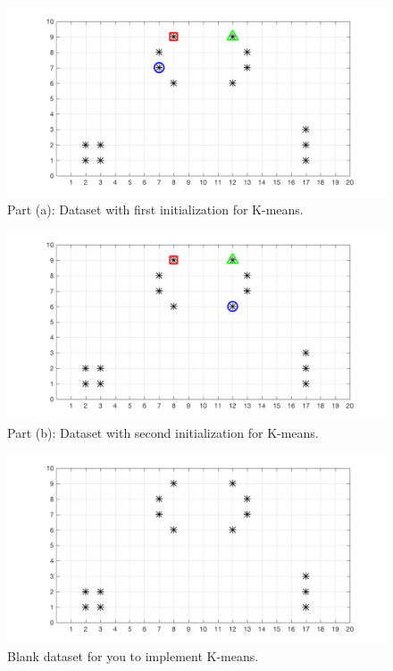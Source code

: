 \begin{enumerate}
\begin{figure}[H]
	\centering
	\includegraphics[scale=0.6]{images/k-means_0}
	\caption{Part (a): Dataset with first initialization for K-means.}
	\label{fig:kmeans_a}
\end{figure}

\begin{figure}[H]
	\centering
	\includegraphics[scale=0.6]{images/k-means_20}
	\caption{Part (b): Dataset with second initialization for K-means.}
	\label{fig:kmeans_b}
\end{figure}

\begin{figure}[H]
  \centering
  \includegraphics[scale=0.6]{images/k-means_blank}
  \caption{Blank dataset for you to implement K-means.}
  \label{fig:kmeans_blank}
\end{figure}

\end{enumerate}



  
